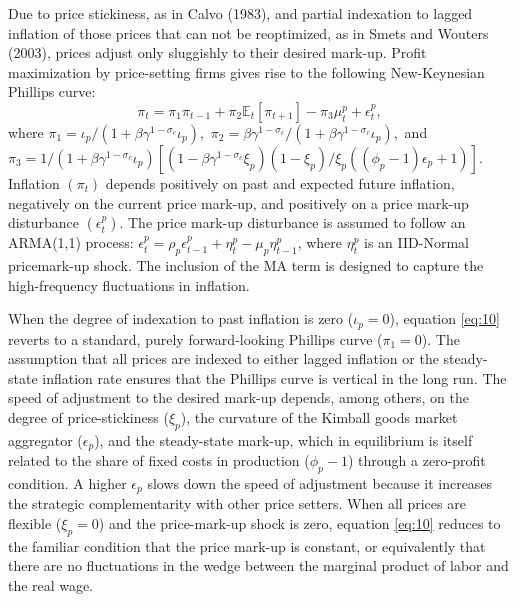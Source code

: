 \documentclass[11pt]{article}
\newcommand{\E}{\mathbb{E}}
\newcommand{\piobs}[1]{\pi_{#1}}
\newcommand{\labor}{labor}
\newcommand{\wage}{wage}
\newcommand{\price}{price}
\newcommand{\prices}{prices}
\newcommand{\inflation}{inflation}
\newcommand{\Inflation}{Inflation}
\newcommand{\inflationrate}{inflation rate}
\begin{document}
Due to \price{} stickiness, as in Calvo (1983), and partial indexation
to lagged \inflation{} of those \prices{} that can not be reoptimized,
as in Smets and Wouters (2003), \prices{} adjust only sluggishly to
their desired mark-up. Profit maximization by \price-setting firms gives
rise to the following New-Keynesian Phillips curve: \begin{equation}
  \label{eq:10}
  \piobs{t} = \pi_1\piobs{t-1} + \pi_2 \E_t[\piobs{t+1}] - \pi_3
  \mu_t^p + \epsilon_t^p,
\end{equation} where
\(\pi_1 = \iota_p / (1+ \beta\gamma^{1-\sigma_c} \iota_p),\)
\(\pi_2 = \beta \gamma^{1-\sigma_c} / (1+\beta \gamma^{1-\sigma_c} \iota_p),\)
and
\(\pi_3 = 1/(1 +\beta \gamma^{1-\sigma_c} \iota_p)[(1- \beta \gamma^{1-\sigma_c} \xi_p)(1-\xi_p) / \xi_p ((\phi_p - 1)\epsilon_p +1)].\)
\Inflation{} \((\piobs{t})\) depends positively on past and expected
future \inflation, negatively on the current \price{} mark-up, and
positively on a \price{} mark-up disturbance \((\epsilon_t^p)\). The
\price{} mark-up disturbance is assumed to follow an ARMA(1,1) process:
\(\epsilon_t^p = \rho_p \epsilon_{t-1}^p + \eta_t^p - \mu_p \eta_{t-1}^p\),
where \(\eta_t^p\) is an IID-Normal \price mark-up shock. The inclusion
of the MA term is designed to capture the high-frequency fluctuations in
\inflation.

When the degree of indexation to past \inflation{} is zero
(\(\iota_p =0\)), equation \eqref{eq:10} reverts to a standard, purely
forward-looking Phillips curve (\(\pi_1 = 0\)). The assumption that all
\prices{} are indexed to either lagged \inflation{} or the steady-state
\inflationrate{} ensures that the Phillips curve is vertical in the long
run. The speed of adjustment to the desired mark-up depends, among
others, on the degree of \price-stickiness (\(\xi_p\)), the curvature of
the Kimball goods market aggregator (\(\epsilon_p\)), and the
steady-state mark-up, which in equilibrium is itself related to the
share of fixed costs in production (\(\phi_p - 1\)) through a
zero-profit condition. A higher \(\epsilon_p\) slows down the speed of
adjustment because it increases the strategic complementarity with other
\price{} setters. When all \prices{} are flexible (\(\xi_p = 0\)) and
the \price-mark-up shock is zero, equation \eqref{eq:10} reduces to the
familiar condition that the \price{} mark-up is constant, or
equivalently that there are no fluctuations in the wedge between the
marginal product of \labor{} and the real \wage.
\end{document}

